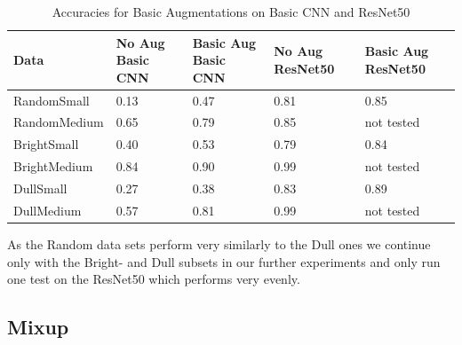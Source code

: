 \documentclass{article}
\begin{document}
\begin{table}[H]
	\caption{Accuracies for Basic Augmentations on Basic CNN and ResNet50}
	\label{sample-table}
	\centering
	\begin{tabular}{lllll}
		\toprule
		Data & No Aug Basic CNN & Basic Aug Basic CNN & No Aug ResNet50 &Basic Aug ResNet50\\
		\midrule
		RandomSmall  & 0.13 & 0.47 & 0.81 & 0.85 \\
		RandomMedium & 0.65 & 0.79 & 0.85 & not tested     \\
		BrightSmall  & 0.40 & 0.53 & 0.79 & 0.84 \\
		BrightMedium & 0.84 & 0.90 & 0.99 & not tested     \\
		DullSmall    & 0.27 & 0.38 & 0.83 & 0.89 \\
		DullMedium   & 0.57 & 0.81 & 0.99 & not tested     \\
		\bottomrule
	\end{tabular}
\end{table}





As the Random data sets perform very similarly to the Dull ones we continue only with the Bright- and Dull subsets in our further experiments and only run one test on the ResNet50 which performs very evenly. 

\subsection{Mixup}
\end{document}
